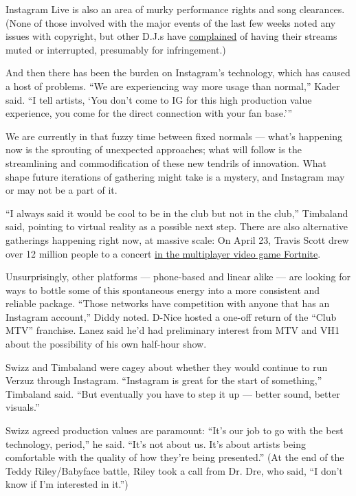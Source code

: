 Instagram Live is also an area of murky performance rights and song
clearances. (None of those involved with the major events of the last
few weeks noted any issues with copyright, but other D.J.s have
\href{https://www.papermag.com/instagram-live-copyright-dj-censoring-2645789312.html?rebelltitem=5\#rebelltitem5}{complained}
of having their streams muted or interrupted, presumably for
infringement.)

And then there has been the burden on Instagram's technology, which has
caused a host of problems. ``We are experiencing way more usage than
normal,'' Kader said. ``I tell artists, `You don't come to IG for this
high production value experience, you come for the direct connection
with your fan base.'''

We are currently in that fuzzy time between fixed normals --- what's
happening now is the sprouting of unexpected approaches; what will
follow is the streamlining and commodification of these new tendrils of
innovation. What shape future iterations of gathering might take is a
mystery, and Instagram may or may not be a part of it.

``I always said it would be cool to be in the club but not in the
club,'' Timbaland said, pointing to virtual reality as a possible next
step. There are also alternative gatherings happening right now, at
massive scale: On April 23, Travis Scott drew over 12 million people to
a concert
\href{https://www.wired.com/story/fortnite-travis-scott-party-royale-third-place/}{in
the multiplayer video game Fortnite}.

Unsurprisingly, other platforms --- phone-based and linear alike --- are
looking for ways to bottle some of this spontaneous energy into a more
consistent and reliable package. ``Those networks have competition with
anyone that has an Instagram account,'' Diddy noted. D-Nice hosted a
one-off return of the ``Club MTV'' franchise. Lanez said he'd had
preliminary interest from MTV and VH1 about the possibility of his own
half-hour show.

Swizz and Timbaland were cagey about whether they would continue to run
Verzuz through Instagram. ``Instagram is great for the start of
something,'' Timbaland said. ``But eventually you have to step it up ---
better sound, better visuals.''

Swizz agreed production values are paramount: ``It's our job to go with
the best technology, period,'' he said. ``It's not about us. It's about
artists being comfortable with the quality of how they're being
presented.'' (At the end of the Teddy Riley/Babyface battle, Riley took
a call from Dr. Dre, who said, ``I don't know if I'm interested in
it.'')

